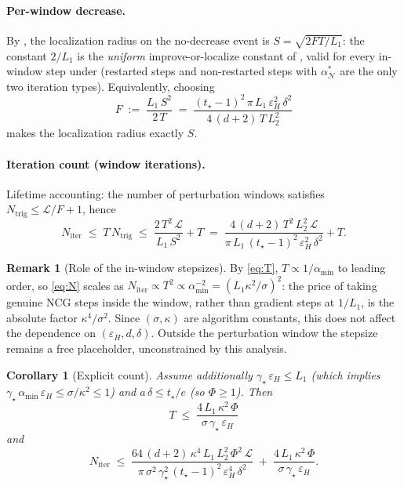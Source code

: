 \documentclass[11pt,a4paper]{article}
\theoremstyle{plain}
\newtheorem{corollary}{Corollary}
\theoremstyle{definition}
\newtheorem{remark}{Remark}
\newcommand{\eps}{\varepsilon}
\newcommand{\epsH}{\eps_{H}}
\newcommand{\setN}{\mathcal{N}}
\newcommand{\LL}{\mathcal{L}}
\newcommand{\Niter}{N_{\mathrm{iter}}}
\newcommand{\Ntrig}{N_{\mathrm{trig}}}
\newcommand{\tstar}{t_\star}
\newcommand{\amin}{\alpha_{\min}}
\begin{document}
\paragraph{Per-window decrease.} By , the
localization radius on the no-decrease event is $S = \sqrt{2FT/L_1}$: the
constant $2/L_1$ is the \emph{uniform} improve-or-localize constant of
, valid for every in-window step under 
(restarted steps and non-restarted steps with $\alpha^{\ast}_{\setN}$ are
the only two iteration types). Equivalently, choosing
\begin{equation}\label{eq:F}
F \;:=\; \frac{L_1\,S^2}{2\,T}
\;=\; \frac{(\tstar-1)^2\,\pi\,L_1\,\epsH^2\,\delta^2}
{4\,(d+2)\,T\,L_2^2}
\tag{F}
\end{equation}
makes the localization radius exactly $S$.

\paragraph{Iteration count (window iterations).} Lifetime accounting:
the number of perturbation windows satisfies
$\Ntrig \le \LL/F + 1$, hence
\begin{equation}\label{eq:N}
\Niter \;\le\; T\,\Ntrig
\;\le\; \frac{2\,T^2\,\LL}{L_1\,S^2} + T
\;=\; \frac{4\,(d+2)\,T^2\,L_2^2\,\LL}
{\pi\,L_1\,(\tstar-1)^2\,\epsH^2\,\delta^2} + T .
\tag{N}
\end{equation}

\begin{remark}[Role of the in-window stepsizes]\label{rem:optalpha}
By \eqref{eq:T}, $T \propto 1/\amin$ to leading order, so \eqref{eq:N}
scales as $\Niter \propto T^2 \propto \amin^{-2} = (L_1\kappa^2/\sigma)^2$:
the price of taking genuine NCG steps inside the window, rather than
gradient steps at $1/L_1$, is the absolute factor $\kappa^4/\sigma^2$.
Since $(\sigma,\kappa)$ are algorithm constants, this does not affect the
dependence on $(\epsH, d, \delta)$. Outside the perturbation window the
stepsize remains a free placeholder, unconstrained by this analysis.
\end{remark}

\begin{corollary}[Explicit count]\label{cor:explicit}
Assume additionally $\gamma_\star\,\epsH \le L_1$ (which implies
$\gamma_\star\,\amin\,\epsH \le \sigma/\kappa^2 \le 1$) and
$a\,\delta \le \tstar/e$ (so $\Phi \ge 1$). Then
\[
T \;\le\; \frac{4\,L_1\,\kappa^2\,\Phi}{\sigma\,\gamma_\star\,\epsH}
\]
and
\begin{equation}\label{eq:Nexplicit}
\Niter \;\le\;
\frac{64\,(d+2)\,\kappa^4\,L_1\,L_2^2\,\Phi^2\,\LL}
{\pi\,\sigma^2\,\gamma_\star^2\,(\tstar-1)^2\,\epsH^4\,\delta^2}
\;+\; \frac{4\,L_1\,\kappa^2\,\Phi}{\sigma\,\gamma_\star\,\epsH} .
\end{equation}
\end{corollary}
\end{document}
